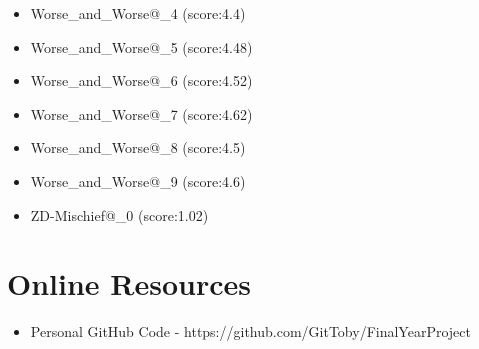 \begin{appendices}
\begin{itemize}
\begin{multicols}{3}
\begin{itemize}
                \item Worse\_and\_Worse@\_4 (score:4.4)
                \item Worse\_and\_Worse@\_5 (score:4.48)
                \item Worse\_and\_Worse@\_6 (score:4.52)
                \item Worse\_and\_Worse@\_7 (score:4.62)
                \item Worse\_and\_Worse@\_8 (score:4.5)
                \item Worse\_and\_Worse@\_9 (score:4.6)
                \item ZD-Mischief@\_0 (score:1.02)
            \end{itemize}
        \end{multicols}
    \end{itemize}
    
    \chapter{Online Resources}\label{apndx:resources}
    \begin{itemize}
        \item Personal GitHub Code - https://github.com/GitToby/FinalYearProject
    \end{itemize}

\end{appendices}